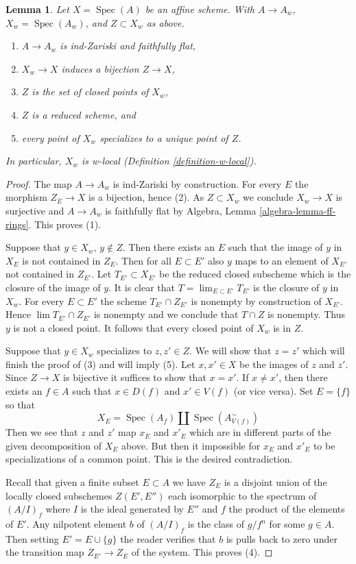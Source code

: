 \documentclass{stacks-project}
\theoremstyle{plain}
\newtheorem{lemma}[subsection]{Lemma}
\theoremstyle{definition}
\theoremstyle{remark}
\numberwithin{equation}{subsection}
\def\lim{\mathop{\mathrm{lim}}\nolimits}
\def\Spec{\mathop{\mathrm{Spec}}}
\begin{document}
\begin{lemma}
\label{lemma-make-w-local}
Let $X = \Spec(A)$ be an affine scheme. With $A \to A_w$, $X_w = \Spec(A_w)$,
and $Z \subset X_w$ as above.
\begin{enumerate}
\item $A \to A_w$ is ind-Zariski and faithfully flat,
\item $X_w \to X$ induces a bijection $Z \to X$,
\item $Z$ is the set of closed points of $X_w$,
\item $Z$ is a reduced scheme, and
\item every point of $X_w$ specializes to a unique point of $Z$.
\end{enumerate}
In particular, $X_w$ is w-local (Definition \ref{definition-w-local}).
\end{lemma}

\begin{proof}
The map $A \to A_w$ is ind-Zariski by construction.
For every $E$ the morphism $Z_E \to X$ is a bijection, hence (2).
As $Z \subset X_w$ we conclude $X_w \to X$ is surjective and
$A \to A_w$ is faithfully flat by
Algebra, Lemma \ref{algebra-lemma-ff-rings}. This proves (1).

\medskip\noindent
Suppose that $y \in X_w$, $y \not \in Z$. Then there
exists an $E$ such that the image of $y$ in $X_E$ is not contained in
$Z_E$. Then for all $E \subset E'$ also $y$ maps to an element of $X_{E'}$
not contained in $Z_{E'}$. Let $T_{E'} \subset X_{E'}$ be the reduced
closed subscheme which is the closure of the image of $y$. It is
clear that $T = \lim_{E \subset E'} T_{E'}$ is the closure of $y$ in $X_w$.
For every $E \subset E'$ the scheme $T_{E'} \cap Z_{E'}$ is nonempty
by construction of $X_{E'}$. Hence $\lim T_{E'} \cap Z_{E'}$ is nonempty
and we conclude that $T \cap Z$ is nonempty. Thus $y$ is not a closed point.
It follows that every closed point of $X_w$ is in $Z$.

\medskip\noindent
Suppose that $y \in X_w$ specializes to $z, z' \in Z$. We will show that
$z = z'$ which will finish the proof of (3) and will imply (5).
Let $x, x' \in X$ be the images of $z$ and $z'$. Since $Z \to X$ is
bijective it suffices to show that $x = x'$. If $x \not = x'$, then
there exists an $f \in A$ such that $x \in D(f)$ and $x' \in V(f)$
(or vice versa). Set $E = \{f\}$ so that
$$
X_E = \Spec(A_f) \amalg \Spec(A_{V(f)}^\sim)
$$
Then we see that $z$ and $z'$ map $x_E$ and $x'_E$ which are in different
parts of the given decomposition of $X_E$ above. But then it impossible
for $x_E$ and $x'_E$ to be specializations of a common point.
This is the desired contradiction.

\medskip\noindent
Recall that given a finite subset $E \subset A$ we have $Z_E$
is a disjoint union of the locally closed subschemes $Z(E', E'')$
each isomorphic to the spectrum of $(A/I)_f$ where $I$ is the ideal
generated by $E''$ and $f$ the product of the elements of $E'$.
Any nilpotent element $b$ of $(A/I)_f$ is the class of $g/f^n$
for some $g \in A$. Then setting $E' = E \cup \{g\}$ the reader
verifies that $b$ is pulls back to zero under the transition map
$Z_{E'} \to Z_E$ of the system. This proves (4).
\end{proof}
\end{document}
